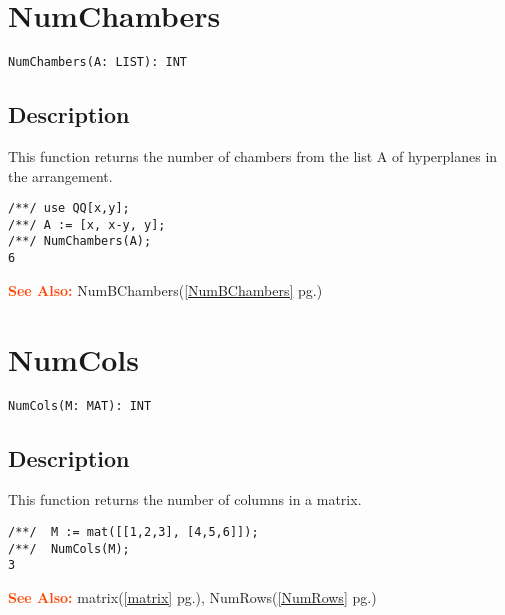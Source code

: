 \documentclass[a4paper]{mybook}
\newenvironment{command}{}{} %
\newcommand\SeeAlso{\par\textcolor{OrangeRed}{\textbf{\large See Also: }}}
\begin{document}
\section{NumChambers}
\label{NumChambers}
\begin{command} %


\begin{Verbatim}[label=syntax, rulecolor=\color{MidnightBlue},
frame=single]
NumChambers(A: LIST): INT 
\end{Verbatim}


\subsection*{Description}

This function returns the number of chambers from the list A of hyperplanes in the arrangement.
\begin{Verbatim}[label=example, rulecolor=\color{PineGreen}, frame=single]
/**/ use QQ[x,y];	
/**/ A := [x, x-y, y];
/**/ NumChambers(A);
6
\end{Verbatim}


\SeeAlso %
  NumBChambers(\ref{NumBChambers} pg.\pageref{NumBChambers})
\end{command} %

\section{NumCols}
\label{NumCols}
\begin{command} %


\begin{Verbatim}[label=syntax, rulecolor=\color{MidnightBlue},
frame=single]
NumCols(M: MAT): INT
\end{Verbatim}


\subsection*{Description}

This function returns the number of columns in a matrix.
\begin{Verbatim}[label=example, rulecolor=\color{PineGreen}, frame=single]
/**/  M := mat([[1,2,3], [4,5,6]]);
/**/  NumCols(M);
3
\end{Verbatim}


\SeeAlso %
  matrix(\ref{matrix} pg.\pageref{matrix}), 
    NumRows(\ref{NumRows} pg.\pageref{NumRows})
\end{command} %
\end{document}
